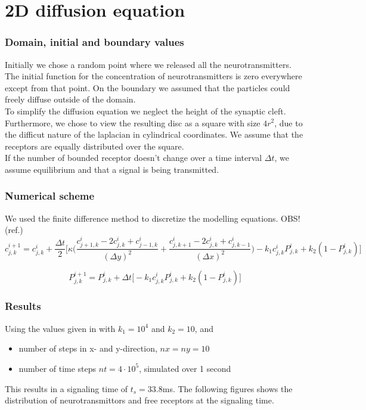 \section{2D diffusion equation}

\subsubsection{Domain, initial and boundary values}

Initially we chose a random point where we released all the neurotransmitters. The initial function for the concentration of neurotransmitters is zero everywhere except from that point. On the boundary we assumed that the particles could freely diffuse outside of the domain.\\
To simplify the diffusion equation we neglect the height of the synaptic cleft. Furthermore, we chose to view the resulting disc as a square with size $4r^2$, due to the difficut nature of the laplacian in cylindrical coordinates. We assume that the receptors are equally distributed over the square.\\If the number of bounded receptor doesn't change over a time interval $\Delta t$, we assume equilibrium and that a signal is being transmitted. \\


\subsubsection{Numerical scheme}
We used the finite difference method to discretize the modelling equations. OBS!(ref.)
$$c_{j,k}^{i+1}=c_{j,k}^{i}+\frac{\Delta t}{2} \Bigg[\kappa \Big(\frac{c_{j+1,k}^{i} -2c_{j,k}^{i} + c_{j-1,k}^{i}}{(\Delta y)^2} +\frac{c_{j,k+1}^{i} -2c_{j,k}^{i} + c_{j,k-1}^{i}}{(\Delta x)^2}\Big)-k_{1}c_{j,k}^i P_{j,k}^i+k_{2}(1-P_{j,k}^i)\Bigg]$$

$$P_{j,k}^{i+1}=P_{j,k}^i + \Delta t \Big[-k_{1}c_{j,k}^iP_{j,k}^i+k_{2}(1-P_{j,k}^i) \Big]$$

\subsubsection{Results}
Using the values given in \cite{fg} with $k_1=10^4$ and $k_2=10$, and 
\begin{itemize}
\item number of steps in x- and y-direction, $nx=ny=10$
\item number of time steps $nt=4\cdot 10^5$, simulated over 1 second
\end{itemize}
This results in a signaling time of $t_s=33.8$ms. The following figures shows the distribution of neurotransmittors and free receptors at the signaling time. 

